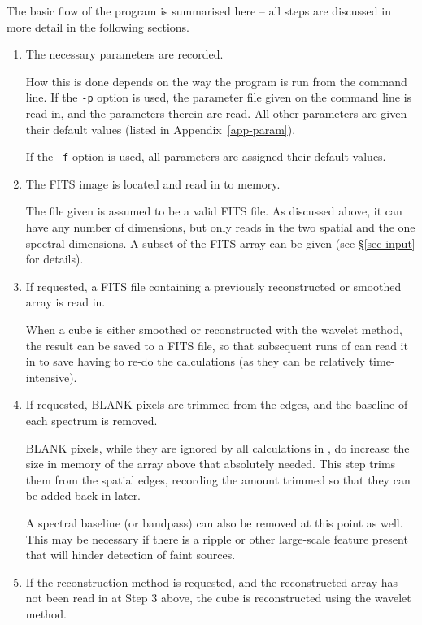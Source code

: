 The basic flow of the program is summarised here -- all steps are
discussed in more detail in the following sections.
\begin{enumerate}
\item The necessary parameters are recorded.

  How this is done depends on the way the program is run from the
  command line. If the \texttt{-p} option is used, the parameter file
  given on the command line is read in, and the parameters therein are
  read. All other parameters are given their default values (listed in
  Appendix~\ref{app-param}).

  If the \texttt{-f} option is used, all parameters are assigned their
  default values.

\item The FITS image is located and read in to memory.

  The file given is assumed to be a valid FITS file. As discussed
  above, it can have any number of dimensions, but \duchamp only
  reads in the two spatial and the one spectral dimensions. A subset
  of the FITS array can be given (see \S\ref{sec-input} for details).

\item If requested, a FITS file containing a previously reconstructed
  or smoothed array is read in.

  When a cube is either smoothed or reconstructed with the \atrous
  wavelet method, the result can be saved to a FITS file, so that
  subsequent runs of \duchamp can read it in to save having to re-do
  the calculations (as they can be relatively time-intensive).

\item \label{step-blank} If requested, BLANK pixels are trimmed from
  the edges, and the baseline of each spectrum is removed.

  BLANK pixels, while they are ignored by all calculations in
  \duchamp, do increase the size in memory of the array above that
  absolutely needed. This step trims them from the spatial edges,
  recording the amount trimmed so that they can be added back in
  later.

  A spectral baseline (or bandpass) can also be removed at this point
  as well. This may be necessary if there is a ripple or other
  large-scale feature present that will hinder detection of faint
  sources.

\item If the reconstruction method is requested, and the reconstructed
  array has not been read in at Step 3 above, the cube is
  reconstructed using the \atrous wavelet method.


\end{enumerate}
